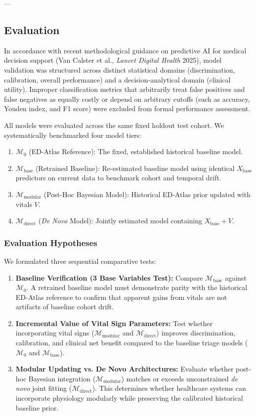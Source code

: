 ---

\subsection{Evaluation}
\label{subsec:evaluation}

In accordance with recent methodological guidance on predictive AI for medical decision support (Van Calster et al., \textit{Lancet Digital Health} 2025), model validation was structured across distinct statistical domains (discrimination, calibration, overall performance) and a decision-analytical domain (clinical utility). Improper classification metrics that arbitrarily treat false positives and false negatives as equally costly or depend on arbitrary cutoffs (such as accuracy, Youden index, and F1 score) were excluded from formal performance assessment.

All models were evaluated across the same fixed holdout test cohort. We systematically benchmarked four model tiers:
\begin{enumerate}
    \item $\mathcal{M}_0$ (ED-Atlas Reference): The fixed, established historical baseline model.
    \item $\mathcal{M}_{\text{base}}$ (Retrained Baseline): Re-estimated baseline model using identical $X_{\text{base}}$ predictors on current data to benchmark cohort and temporal drift.
    \item $\mathcal{M}_{\text{modular}}$ (Post-Hoc Bayesian Model): Historical ED-Atlas prior updated with vitals $V$.
    \item $\mathcal{M}_{\text{direct}}$ (\textit{De Novo} Model): Jointly estimated model containing $X_{\text{base}} + V$.
\end{enumerate}

\subsubsection{Evaluation Hypotheses}
We formulated three sequential comparative tests:
\begin{enumerate}
    \item \textbf{Baseline Verification (3 Base Variables Test):} Compare $\mathcal{M}_{\text{base}}$ against $\mathcal{M}_0$. A retrained baseline model must demonstrate parity with the historical ED-Atlas reference to confirm that apparent gains from vitals are not artifacts of baseline cohort drift.
    \item \textbf{Incremental Value of Vital Sign Parameters:} Test whether incorporating vital signs ($\mathcal{M}_{\text{modular}}$ and $\mathcal{M}_{\text{direct}}$) improves discrimination, calibration, and clinical net benefit compared to the baseline triage models ($\mathcal{M}_0$ and $\mathcal{M}_{\text{base}}$).
    \item \textbf{Modular Updating vs. De Novo Architectures:} Evaluate whether post-hoc Bayesian integration ($\mathcal{M}_{\text{modular}}$) matches or exceeds unconstrained \textit{de novo} joint fitting ($\mathcal{M}_{\text{direct}}$). This determines whether healthcare systems can incorporate physiology modularly while preserving the calibrated historical baseline prior.
\end{enumerate}

